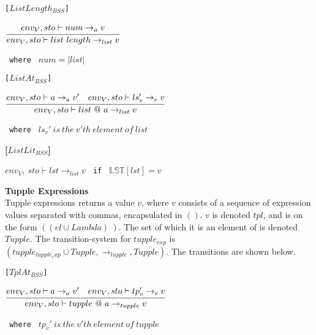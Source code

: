 {\texttt{[$ListLength_{BSS}$]}\\
\begin{center}
	\begin{math}
		\cfrac
			{env_V, sto \vdash num \rightarrow_{a} v}
			{env_V, sto \vdash list\ length \rightarrow_{list} v}
	\end{math}
	
	\texttt{ where } $num = |list|$
\end{center}

\texttt{[$ListAt_{BSS}$]}\\
\begin{center}
	\begin{math}
		\cfrac
			{env_V, sto \vdash a \rightarrow_{a} v' \quad env_V, sto \vdash ls_v' \rightarrow_e v}
			{env_V, sto \vdash list\ @\ a \rightarrow_{list} v}
	\end{math}
	
	\texttt{ where } $ls_v'\ is\ the\ v'th\ element\ of\ list$
\end{center}

\textbf{[$ListLit_{BSS}$]}\\
\begin{center}
	\begin{math}
	env_V,\ sto \vdash lst \rightarrow_{list} v
	\end{math}
	\texttt{ if } $\mathbb{LST}[lst] = v$
\end{center}

\textbf{\Large{Tupple Expressions}}\\
Tupple expressions returns a value $v$, where $v$ consists of a sequence of expression values separated with commas, encapsulated in $()$.
$v$ is denoted $tpl$, and is on the form $((el \cup Lambda)~)$.
The set of which it is an element of is denoted $Tupple$.
The transition-system for $tupple_{exp}$ is $(tupple_{tupple_exp} \cup Tupple, \rightarrow_{tupple}, Tupple)$.
The transitions are shown below.

\texttt{[$TplAt_{BSS}$]}\\
\begin{center}
	\begin{math}
	\cfrac
	{env_V, sto \vdash a \rightarrow_{a} v' \quad env_V, sto \vdash tp_v' \rightarrow_e v}
	{env_V, sto \vdash tupple\ @\ a \rightarrow_{tupple} v}
	\end{math}
	
	\texttt{ where } $tp_v'\ is\ the\ v'th\ element\ of\ tupple$
\end{center}

}
